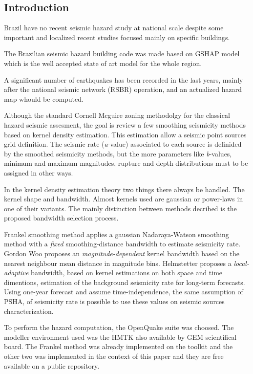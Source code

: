 \documentclass[draft, grl]{agutex}
\begin{document}
\begin{article}

\section{Introduction}

Brazil have no recent seismic hazard study at national scale despite some important and localized recent studies focused mainly on specific buildings.

The Brazilian seismic hazard building code was made based on GSHAP model which is the well accepted state of art model for the whole region.

A significant number of earthquakes has been recorded in the last years, mainly after the national seismic network (RSBR) operation, and an actualized hazard map whould be computed.

Although the standard Cornell Mcguire zoning methodolgy for the classical hazard seismic assesment, the goal is review a few smoothing seismicity methods based on kernel density estimation. This estimation allow a seismic point sources grid definition. The seismic rate (\emph{a}-value) associated to each source is definided by the smoothed seismicity methods, but the more parameters like \emph{b}-values, minimum and maximum magnitudes, rupture and depth distributions must to be assigned in other ways.

In the kernel density estimation theory two things there always be handled. The kernel shape and bandwidth. Almost kernels used are gaussian or power-laws in one of their variants. The mainly distinction between methods decribed is the proposed bandwidth selection process.

Frankel smoothing method applies a gaussian Nadaraya-Watson smoothing method with a \emph{fixed} smoothing-distance bandwidth to estimate seismicity rate. Gordon Woo proposes an \emph{magnitude-dependent} kernel bandwidth based on the nearest neighbour mean distance in magnitude bins. Helmstetter proposes a \emph{local-adaptive} bandwidth, based on kernel estimations on both space and time dimentions, estimation of the background seismicity rate for long-term forecasts. Using one-year forecast and assume time-independence, the same assumption of PSHA, of seismicity rate is possible to use these values on seismic sources characterization.

To perform the hazard computation, the OpenQuake suite was choosed. The modeller environment used was the HMTK also available by GEM scientifical board. The Frankel method was already implemented on the toolkit and the other two was implemented in the context of this paper and they are free available on a public repository.


\end{article}
\end{document}
